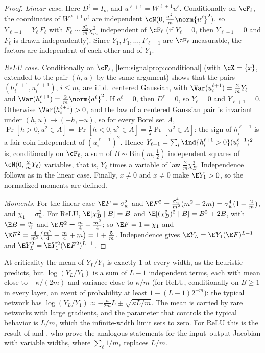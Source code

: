 \begin{refsection}
\begin{proof}
\emph{Linear case.} Here $D^\ell=I_m$ and $u^{\ell+1}=W^{\ell+1}u^\ell$. Conditionally on $\cF_\ell$, the coordinates of $W^{\ell+1}u^\ell$ are independent $\cN(0,\frac{\sigma_w^2}m\norm{u^\ell}^2)$, so $Y_{\ell+1}=Y_\ell\,F_\ell$ with $F_\ell\sim\frac{\sigma_w^2}m\chi^2_m$ independent of $\cF_\ell$ (if $Y_\ell=0$, then $Y_{\ell+1}=0$ and $F_\ell$ is drawn independently). Since $Y_1,F_1,\dots,F_{\ell-1}$ are $\cF_\ell$-measurable, the factors are independent of each other and of $Y_1$.

\emph{ReLU case.} Conditionally on $\cF_\ell$, \cref{lem:signalprop:conditional} (with $\cX=\{x\}$, extended to the pair $(h,u)$ by the same argument) shows that the pairs $(h^{\ell+1}_i,u^{\ell+1}_i)$, $i\le m$, are i.i.d.\ centered Gaussian, with $\Var(u^{\ell+1}_i)=\frac2m Y_\ell$ and $\Var(h^{\ell+1}_i)=\frac2m\norm{a^\ell}^2$. If $a^\ell=0$, then $D^\ell=0$, so $Y_\ell=0$ and $Y_{\ell+1}=0$. Otherwise $\Var(h^{\ell+1}_i)>0$, and the law of a centered Gaussian pair is invariant under $(h,u)\mapsto(-h,-u)$, so for every Borel set $A$, $\Pr[h>0,u^2\in A]=\Pr[h<0,u^2\in A]=\frac12\Pr[u^2\in A]$: the sign of $h^{\ell+1}_i$ is a fair coin independent of $(u^{\ell+1}_i)^2$. Hence $Y_{\ell+1}=\sum_i\ind\{h^{\ell+1}_i>0\}(u^{\ell+1}_i)^2$ is, conditionally on $\cF_\ell$, a sum of $B\sim\mathrm{Bin}(m,\frac12)$ independent squares of $\cN(0,\frac2mY_\ell)$ variables, that is, $Y_\ell$ times a variable of law $\frac2m\chi^2_B$. Independence follows as in the linear case. Finally, $x\ne0$ and $\dot x\ne0$ make $\E Y_1>0$, so the normalized moments are defined.

\emph{Moments.} For the linear case $\E F=\sigma_w^2$ and $\E F^2=\frac{\sigma_w^4}{m^2}(m^2+2m)=\sigma_w^4(1+\frac2m)$, and $\chi_1=\sigma_w^2$. For ReLU, $\E[\chi^2_B\mid B]=B$ and $\E[(\chi^2_B)^2\mid B]=B^2+2B$, with $\E B=\frac m2$ and $\E B^2=\frac m4+\frac{m^2}4$; so $\E F=1=\chi_1$ and $\E F^2=\frac4{m^2}\bigl(\frac{m^2}4+\frac m4+m\bigr)=1+\frac5m$. Independence gives $\E Y_L=\E Y_1(\E F)^{L-1}$ and $\E Y_L^2=\E Y_1^2(\E F^2)^{L-1}$.
\end{proof}

At criticality the mean of $Y_L/Y_1$ is exactly $1$ at every width, as the heuristic predicts, but $\log(Y_L/Y_1)$ is a sum of $L-1$ independent terms, each with mean close to $-\kappa/(2m)$ and variance close to $\kappa/m$ (for ReLU, conditionally on $B\ge1$ in every layer, an event of probability at least $1-(L-1)2^{-m}$): the typical network has $\log(Y_L/Y_1)\approx-\frac{\kappa}{2m}L\pm\sqrt{\kappa L/m}$. The mean is carried by rare networks with large gradients, and the parameter that controls the typical behavior is $L/m$, which the infinite-width limit sets to zero. For ReLU this is the result of \textcite{Hanin2018} and \textcite{HaninNica2020}, who prove the analogous statements for the input--output Jacobian with variable widths, where $\sum_\ell1/m_\ell$ replaces $L/m$.


\end{refsection}
